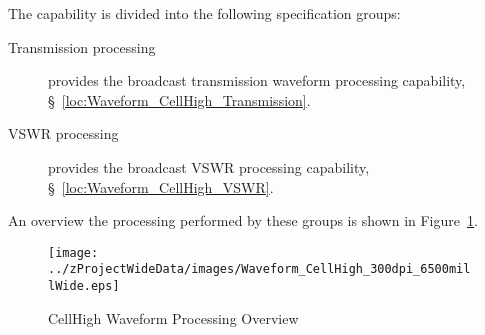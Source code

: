 The \ThisSys \ThisSegment \CellHigh capability is divided into the following specification groups:
\begin{description}
	\item[Transmission processing] provides the \CellHigh broadcast transmission waveform processing capability, \S~\ref{loc:Waveform_CellHigh_Transmission}.
	\item[VSWR processing]  provides the \CellHigh broadcast VSWR processing capability, \S~\ref{loc:Waveform_CellHigh_VSWR}.
\end{description}
An overview the processing performed by these groups is shown in Figure~\ref{fig:CellHigh_Waveform_Processing}.
\begin{figure}[htbp]
	\centering
		\texttt{[image: ../zProjectWideData/images/Waveform\_CellHigh\_300dpi\_6500millWide.eps]}
	\caption[CellHigh Waveform Processing Overview]{CellHigh Waveform Processing Overview}
	\label{fig:CellHigh_Waveform_Processing}
\end{figure}

%
%
%

